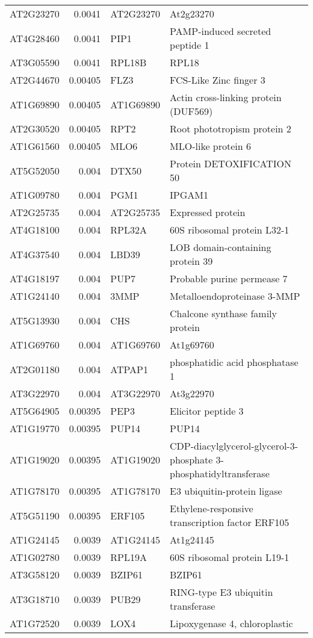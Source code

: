 \documentclass[a4paper]{article}
\begin{document}
\begin{center}
\begin{tabular}{lrll}
AT2G23270 & 0.0041 & AT2G23270 & At2g23270\\
AT4G28460 & 0.0041 & PIP1 & PAMP-induced secreted peptide 1\\
AT3G05590 & 0.0041 & RPL18B & RPL18\\
AT2G44670 & 0.00405 & FLZ3 & FCS-Like Zinc finger 3\\
AT1G69890 & 0.00405 & AT1G69890 & Actin cross-linking protein (DUF569)\\
AT2G30520 & 0.00405 & RPT2 & Root phototropism protein 2\\
AT1G61560 & 0.00405 & MLO6 & MLO-like protein 6\\
AT5G52050 & 0.004 & DTX50 & Protein DETOXIFICATION 50\\
AT1G09780 & 0.004 & PGM1 & IPGAM1\\
AT2G25735 & 0.004 & AT2G25735 & Expressed protein\\
AT4G18100 & 0.004 & RPL32A & 60S ribosomal protein L32-1\\
AT4G37540 & 0.004 & LBD39 & LOB domain-containing protein 39\\
AT4G18197 & 0.004 & PUP7 & Probable purine permease 7\\
AT1G24140 & 0.004 & 3MMP & Metalloendoproteinase 3-MMP\\
AT5G13930 & 0.004 & CHS & Chalcone synthase family protein\\
AT1G69760 & 0.004 & AT1G69760 & At1g69760\\
AT2G01180 & 0.004 & ATPAP1 & phosphatidic acid phosphatase 1\\
AT3G22970 & 0.004 & AT3G22970 & At3g22970\\
AT5G64905 & 0.00395 & PEP3 & Elicitor peptide 3\\
AT1G19770 & 0.00395 & PUP14 & PUP14\\
AT1G19020 & 0.00395 & AT1G19020 & CDP-diacylglycerol-glycerol-3-phosphate 3-phosphatidyltransferase\\
AT1G78170 & 0.00395 & AT1G78170 & E3 ubiquitin-protein ligase\\
AT5G51190 & 0.00395 & ERF105 & Ethylene-responsive transcription factor ERF105\\
AT1G24145 & 0.0039 & AT1G24145 & At1g24145\\
AT1G02780 & 0.0039 & RPL19A & 60S ribosomal protein L19-1\\
AT3G58120 & 0.0039 & BZIP61 & BZIP61\\
AT3G18710 & 0.0039 & PUB29 & RING-type E3 ubiquitin transferase\\
AT1G72520 & 0.0039 & LOX4 & Lipoxygenase 4, chloroplastic\\

\end{tabular}
\end{center}
\end{document}
